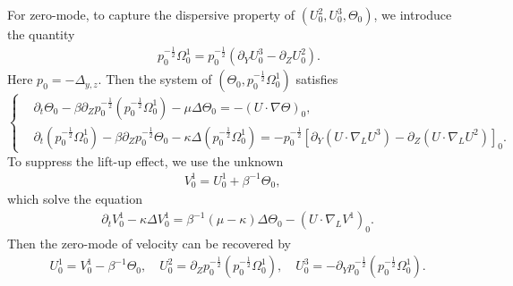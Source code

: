 \documentclass[12pt]{article}
\numberwithin{equation}{section}
\begin{document}
	For zero-mode, to capture the dispersive property of $(U^2_0,U^3_0,\Theta_0)$, we introduce the quantity
	\begin{align*}
		\quad p_0^{-\frac{1}{2}}\Omega^1_0=p_0^{-\frac{1}{2}}(\partial_YU^3_0-\partial_ZU^2_0).
	\end{align*}
    Here $p_0=-\Delta_{y,z}$.	Then the system of $(\Theta_0,p_0^{-\frac{1}{2}}\Omega^1_0)$ satisfies
	\begin{equation}\label{eq-the0}
	    \left\{
        \begin{aligned}
            &\partial_t \Theta_0-\beta\partial_Zp_0^{-\frac{1}{2}}(p_0^{-\frac{1}{2}}\Omega^1_0)-\mu \Delta\Theta_0=-(U\cdot\nabla \Theta)_0,\\
		&\partial_t (p_0^{-\frac{1}{2}}\Omega^1_0)-\beta\partial_Zp_0^{-\frac{1}{2}}\Theta_0-\kappa \Delta(p_0^{-\frac{1}{2}}\Omega^1_0)=-p_0^{-\frac{1}{2}}[\partial_Y(U\cdot\nabla_LU^3)-\partial_Z(U\cdot\nabla_LU^2)]_0.
        \end{aligned}\right.
	\end{equation}
    To suppress the lift-up effect, we use the unknown
    \begin{align*}
        V^1_0=U^1_0+\beta^{-1}\Theta_0,
    \end{align*}
    which solve the equation
    \begin{align*}
		&\partial_t V^1_0-\kappa \Delta V^1_0=\beta^{-1}(\mu-\kappa)\Delta\Theta_0-(U\cdot\nabla_LV^1)_0.
	\end{align*}
	Then the zero-mode of velocity can be recovered by
	\begin{align}\label{eq-zero}
		&U^1_0=V^1_0-\beta^{-1}\Theta_0,\quad
		U^2_0=\partial_Zp_0^{-\frac{1}{2}}(p_0^{-\frac{1}{2}}\Omega^1_0),\quad
		U^3_0=-\partial_Yp_0^{-\frac{1}{2}}(p_0^{-\frac{1}{2}}\Omega^1_0).
	\end{align}
\end{document}

